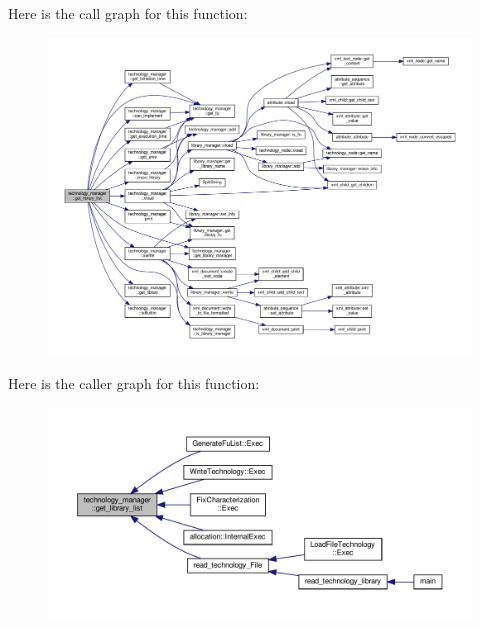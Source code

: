 Here is the call graph for this function\+:
\nopagebreak
\begin{figure}[H]
\begin{center}
\leavevmode
\includegraphics[width=350pt]{df/dc7/classtechnology__manager_a627c7ca63f6fd50d575f5ebffcec34a2_cgraph}
\end{center}
\end{figure}
Here is the caller graph for this function\+:
\nopagebreak
\begin{figure}[H]
\begin{center}
\leavevmode
\includegraphics[width=350pt]{df/dc7/classtechnology__manager_a627c7ca63f6fd50d575f5ebffcec34a2_icgraph}
\end{center}
\end{figure}
\mbox{\label{classtechnology__manager_af288b80068545def60e503ceddc109ae}} 
